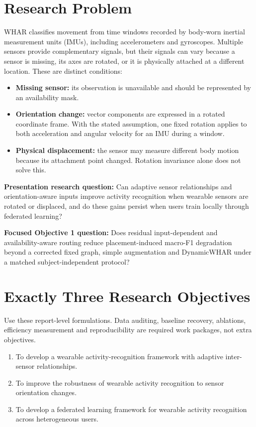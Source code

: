 \documentclass[10pt,a4paper]{article}
\begin{document}
\section{Research Problem}
WHAR classifies movement from time windows recorded by body-worn inertial measurement units (IMUs), including accelerometers and gyroscopes. Multiple sensors provide complementary signals, but their signals can vary because a sensor is missing, its axes are rotated, or it is physically attached at a different location. These are distinct conditions:
\begin{itemize}
\item \textbf{Missing sensor:} its observation is unavailable and should be represented by an availability mask.
\item \textbf{Orientation change:} vector components are expressed in a rotated coordinate frame. With the stated assumption, one fixed rotation applies to both acceleration and angular velocity for an IMU during a window.
\item \textbf{Physical displacement:} the sensor may measure different body motion because its attachment point changed. Rotation invariance alone does not solve this.
\end{itemize}

\textbf{Presentation research question:} Can adaptive sensor relationships and orientation-aware inputs improve activity recognition when wearable sensors are rotated or displaced, and do these gains persist when users train locally through federated learning?

\textbf{Focused Objective 1 question:} Does residual input-dependent and availability-aware routing reduce placement-induced macro-F1 degradation beyond a corrected fixed graph, simple augmentation and DynamicWHAR under a matched subject-independent protocol?

\section{Exactly Three Research Objectives}
Use these report-level formulations. Data auditing, baseline recovery, ablations, efficiency measurement and reproducibility are required work packages, not extra objectives.
\begin{enumerate}[label=\textbf{O\arabic*.}]
\item To develop a wearable activity-recognition framework with adaptive inter-sensor relationships.
\item To improve the robustness of wearable activity recognition to sensor orientation changes.
\item To develop a federated learning framework for wearable activity recognition across heterogeneous users.
\end{enumerate}
\end{document}
